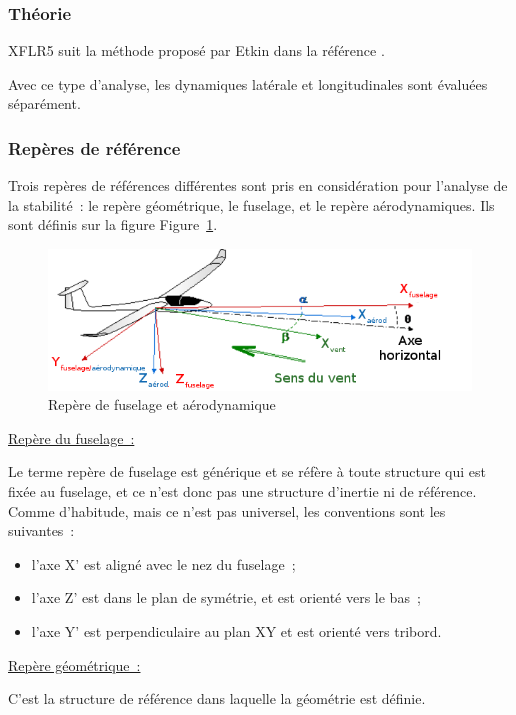 \documentclass[a4paper,twoside,12pt,dvips]{article}
\begin{document}
\subsubsection{Théorie}

XFLR5 suit la méthode proposé par Etkin dans la référence \cite{Etkin}.

Avec ce type d’analyse, les dynamiques latérale et longitudinales sont évaluées séparément.

\subsubsection{Repères de référence}

Trois repères de références différentes sont pris en considération pour l’analyse de la stabilité~: le repère géométrique, le fuselage, et le repère aérodynamiques. Ils sont définis sur la figure 
Figure~\ref{img:repères_fuselage_aérodynamique}.

\begin{figure}[htbp]
	\centering
	\includegraphics[width=0.8\linewidth]{img-46-fr}
	\caption{Repère de fuselage et aérodynamique}
	\label{img:repères_fuselage_aérodynamique}
\end{figure}

\underline{Repère du fuselage~:}

Le terme repère de fuselage est générique et se réfère à toute structure 
qui est fixée au fuselage, et ce n’est donc pas une structure d’inertie
ni de référence. Comme d’habitude, mais ce n’est pas universel, les
conventions sont les suivantes~:

\begin{itemize}
	\item l’axe X' est aligné avec le nez du fuselage~;
	\item l’axe Z' est dans le plan de symétrie, et est orienté vers le bas~;
	\item l’axe Y' est perpendiculaire au plan XY et est orienté vers tribord.
\end{itemize}

\underline{Repère géométrique~:}

C’est la structure de référence dans laquelle la géométrie est définie.
\end{document}
